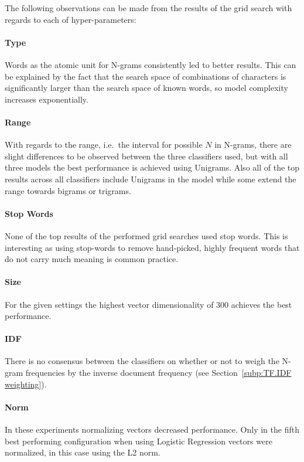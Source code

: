 The following observations can be made from the results of the grid search with regards to each of hyper-parameters:


\paragraph{Type}
\label{par:Type}
Words as the atomic unit for N-grams consistently led to better results. This can be explained by the fact that the search space of combinations of characters is significantly larger than the search space of known words, so model complexity increases exponentially.

\paragraph{Range}
\label{par:Range}
With regards to the range, i.e.\ the interval for possible $N$ in N-grams, there are slight differences to be observed between the three classifiers used, but with all three models the best performance is achieved using Unigrams. Also all of the top results across all classifiers include Unigrams in the model while some extend the range towards bigrams or trigrams.

\paragraph{Stop Words}
\label{par:Stop Words}
None of the top results of the performed grid searches used stop words. This is interesting as using stop-words to remove hand-picked, highly frequent words that do not carry much meaning is common practice.

\paragraph{Size}
\label{par:Size}
For the given settings the highest vector dimensionality of 300 achieves the best performance.

\paragraph{IDF}
\label{par:IDF}
There is no consensus between the classifiers on whether or not to weigh the N-gram frequencies by the inverse document frequency (see Section~\ref{subp:TF.IDF weighting}).

\paragraph{Norm}
\label{par:Norm}
In these experiments normalizing vectors decreased performance.
Only in the fifth best performing configuration when using Logistic Regression vectors were normalized, in this case using the L2 norm.

